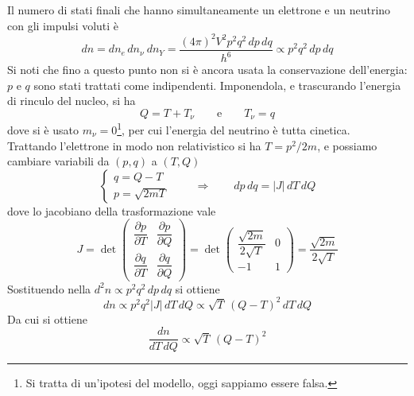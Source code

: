 Il numero di stati finali che hanno simultaneamente un elettrone e un neutrino con gli impulsi voluti è
%
\begin{equation}
    dn = dn_e \, dn_{\nu} \ dn_Y = \frac{(4\pi)^2 V^2 p^2 q^2 \, dp \, dq}{h^6} \propto p^2 q^2 \, dp \, dq
\end{equation}
Si noti che fino a questo punto non si è ancora usata la conservazione dell'energia: $p$ e $q$ sono stati trattati come indipendenti. Imponendola, e trascurando l'energia di rinculo del nucleo, si ha
%
\begin{equation}
    Q = T + T_{\nu} \qquad \text{e} \qquad T_{\nu} = q
\end{equation}
dove si è usato $m_{\nu} = 0$\footnote{Si tratta di un'ipotesi del modello, oggi sappiamo essere falsa.}, per cui l'energia del neutrino è tutta cinetica.\\

Trattando l'elettrone in modo non relativistico si ha $T = p^2/2m$, e possiamo cambiare variabili da $(p,q)$ a $(T,Q)$
%
\begin{equation*}
\begin{cases}
    q = Q - T \\[4pt]
    p = \sqrt{2mT}
\end{cases}
\qquad \Longrightarrow \qquad
dp \, dq = \left| J \right| \, dT \, dQ
\end{equation*}
dove lo jacobiano della trasformazione vale
%
\begin{equation}
    J = \det \begin{pmatrix} \dfrac{\partial p}{\partial T} & \dfrac{\partial p}{\partial Q} \\[10pt] \dfrac{\partial q}{\partial T} & \dfrac{\partial q}{\partial Q} \end{pmatrix}
    = \det \begin{pmatrix} \dfrac{\sqrt{2m}}{2\sqrt{T}} & 0 \\[10pt] -1 & 1 \end{pmatrix}
    = \frac{\sqrt{2m}}{2 \sqrt{T}}
\end{equation}Sostituendo nella $d^2 n \propto p^2 q^2 \, dp \, dq$ si ottiene
%
\begin{equation}
    d n \propto p^2 q^2 |J| \, dT \, dQ \propto \sqrt{T} \, (Q-T)^2 \, dT \, dQ
\end{equation}
Da cui si ottiene
%
\begin{equation}
    \frac{d n}{dT \, dQ} \propto \sqrt{T} \, (Q-T)^2
    \label{eq:densita_stati_beta}
\end{equation}

